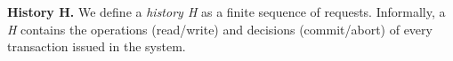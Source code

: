 
%
%
%

\iffalse
\textbf{History H.} We define a \textit{history H} as a finite sequence of requests. Informally, a \textit{H} contains the operations (read/write) and decisions (commit/abort) of every transaction issued in the system.

